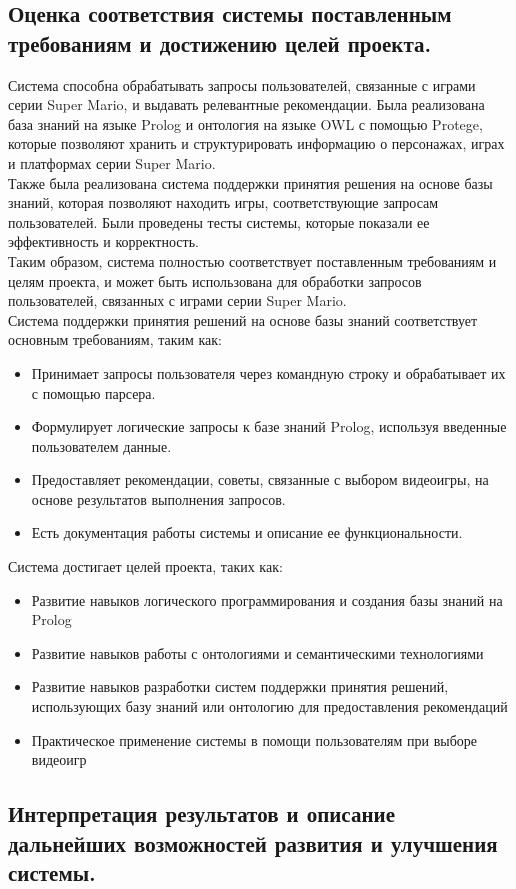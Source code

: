 \documentclass[12pt,onecolumn]{article}
\begin{document}
\subsection{Оценка соответствия системы поставленным требованиям и достижению целей проекта.}
Система способна обрабатывать запросы пользователей, связанные с играми серии Super Mario, и выдавать релевантные рекомендации. Была реализована база знаний на языке Prolog и онтология на языке OWL с помощью Protege, которые позволяют хранить и структурировать информацию о персонажах, играх и платформах серии Super Mario.\\
Также была реализована система поддержки принятия решения на основе базы знаний, которая позволяют находить игры, соответствующие запросам пользователей. Были проведены тесты системы, которые показали ее эффективность и корректность.\\
Таким образом, система полностью соответствует поставленным требованиям и целям проекта, и может быть использована для обработки запросов пользователей, связанных с играми серии Super Mario.\\
Система поддержки принятия решений на основе базы знаний соответствует основным требованиям, таким как:
\begin{itemize}
  \item Принимает запросы пользователя через командную строку и обрабатывает их с помощью парсера.
  \item Формулирует логические запросы к базе знаний Prolog, используя введенные пользователем данные.
  \item Предоставляет рекомендации, советы, связанные с выбором видеоигры, на основе результатов выполнения запросов.
  \item Есть документация работы системы и описание ее функциональности.
\end{itemize}
Система достигает целей проекта, таких как:
\begin{itemize}
  \item Развитие навыков логического программирования и создания базы знаний на Prolog
  \item Развитие навыков работы с онтологиями и семантическими технологиями
  \item Развитие навыков разработки систем поддержки принятия решений, использующих базу знаний или онтологию для предоставления рекомендаций
  \item Практическое применение системы в помощи пользователям при выборе видеоигр
\end{itemize}
\subsection{Интерпретация результатов и описание дальнейших возможностей развития и улучшения системы.}
\end{document}

